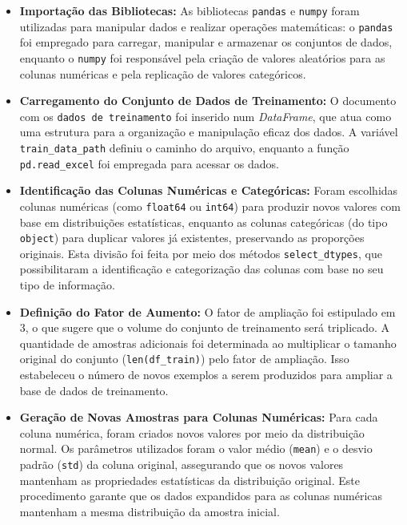 \begin{itemize}
  \item \textbf{Importação das Bibliotecas:} As bibliotecas \texttt{pandas} e \texttt{numpy} foram utilizadas para manipular dados e realizar operações matemáticas: o \texttt{pandas} foi empregado para carregar, manipular e armazenar os conjuntos de dados, enquanto o \texttt{numpy} foi responsável pela criação de valores aleatórios para as colunas numéricas e pela replicação de valores categóricos.

  \item \textbf{Carregamento do Conjunto de Dados de Treinamento:} O documento  com os \texttt{dados de treinamento} foi inserido num \textit{DataFrame}, que atua como uma estrutura para a organização e manipulação eficaz dos dados. A variável \texttt{train\_data\_path} definiu o caminho do arquivo, enquanto a função \texttt{pd.read\_excel} foi empregada para acessar os dados.

  \item \textbf{Identificação das Colunas Numéricas e Categóricas:} Foram escolhidas colunas numéricas (como \texttt{float64} ou \texttt{int64}) para produzir novos valores com base em distribuições estatísticas, enquanto as colunas categóricas (do tipo \texttt{object}) para duplicar valores já existentes, preservando as proporções originais. Esta divisão foi feita por meio dos métodos \texttt{select\_dtypes}, que possibilitaram a identificação e categorização das colunas com base no seu tipo de informação.

  \item \textbf{Definição do Fator de Aumento:} O fator de ampliação foi estipulado em 3, o que sugere que o volume do conjunto de treinamento será triplicado. A quantidade de amostras adicionais foi determinada ao multiplicar o tamanho original do conjunto (\texttt{len(df\_train)}) pelo fator de ampliação. Isso estabeleceu o número de novos exemplos a serem produzidos para ampliar a base de dados de treinamento.

  \item \textbf{Geração de Novas Amostras para Colunas Numéricas:} Para cada coluna numérica, foram criados novos valores por meio da distribuição normal. Os parâmetros utilizados foram o valor médio (\texttt{mean}) e o desvio padrão (\texttt{std}) da coluna original, assegurando que os novos valores mantenham as propriedades estatísticas da distribuição original. Este procedimento garante que os dados expandidos para as colunas numéricas mantenham a mesma distribuição da amostra inicial.


\end{itemize}
